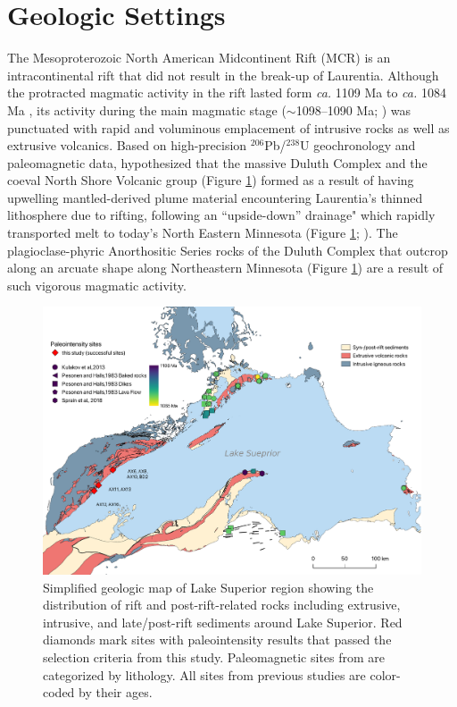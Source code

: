 \documentclass[draft]{agujournal2019}
\begin{document}
\section*{Geologic Settings}

The Mesoproterozoic North American Midcontinent Rift (MCR) is an intracontinental rift that did not result in the break-up of Laurentia. Although the protracted magmatic activity in the rift lasted form \textit{ca.} 1109 Ma to \textit{ca.} 1084 Ma \cite{Swanson-Hysell2019a}, its activity during the main magmatic stage ($\sim$1098–1090 Ma; ) was punctuated with rapid and voluminous emplacement of intrusive rocks as well as extrusive volcanics. Based on high-precision $^{206}$Pb/$^{238}$U geochronology and paleomagnetic data,  hypothesized that the massive Duluth Complex and the coeval North Shore Volcanic group (Figure \ref{fig:Geologic_map}) formed as a result of having upwelling mantled-derived plume material encountering Laurentia's thinned lithosphere due to rifting, following an ``upside-down” drainage" which rapidly transported melt to today's North Eastern Minnesota (Figure \ref{fig:Geologic_map}; ). The plagioclase-phyric Anorthositic Series rocks of the Duluth Complex that outcrop along an arcuate shape along Northeastern Minnesota (Figure \ref{fig:Geologic_map}) are a result of such vigorous magmatic activity. 

\begin{figure}
\centering
\noindent\includegraphics[width=\textwidth]{Geologic_map.pdf}
\caption{\footnotesize{Simplified geologic map of Lake Superior region showing the distribution of rift and post-rift-related rocks including extrusive, intrusive, and late/post-rift sediments around Lake Superior. Red diamonds mark sites with paleointensity results that passed the selection criteria from this study. Paleomagnetic sites from  are categorized by lithology. All sites from previous studies are color-coded by their ages.}}
\label{fig:Geologic_map}
\end{figure}
\end{document}
